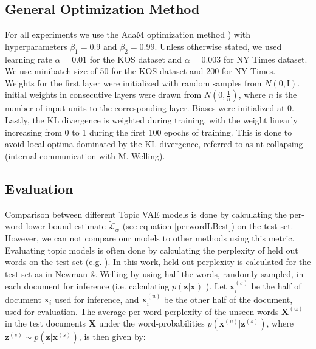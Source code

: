 \documentclass{report}
\begin{document}
	\subsection{General Optimization Method}\label{optim_section}
	For all experiments we use the AdaM optimization method \cite{kingma2014adam}) with hyperparameters $\beta_1 = 0.9$ and $\beta_2 = 0.99$. Unless otherwise stated, we used learning rate $\alpha = 0.01$ for the KOS dataset and $\alpha = 0.003$ for NY Times dataset.  We use minibatch size of 50 for the KOS dataset and 200 for NY Times.  \\
	Weights for the first layer were initialized with random samples from $N(0,\text{I})$. initial weights in consecutive layers were drawn from  $N(0,\frac{1}{n})$, where $n$ is the number of input units to the corresponding layer. Biases were initialized at 0.
	\\Lastly, the KL divergence is weighted during training, with the weight linearly increasing from 0 to 1 during the first 100 epochs of training. This is done to avoid local optima dominated by the KL divergence, referred to as nt collapsing (internal communication with M. Welling).
	
	\subsection{Evaluation}\label{eval_section}
	Comparison between different Topic VAE models is done by calculating the per-word lower bound estimate $\tilde{\mathcal{L}}_w$ (see equation \ref{perwordLBest}) on the test set. However, we can not compare our models to other methods using this metric. \\
	Evaluating topic models is often done by calculating the perplexity of held out words on the test set (e.g. \cite{blei2003latent, newman2007distributed, ranganath2015deep}). In this work, held-out perplexity is calculated for the test set as in Newman \& Welling \cite{newman2007distributed} by using half the words, randomly sampled, in each document for inference (i.e. calculating $p(\mathbf{z}|\mathbf{x})$ ). Let $\mathbf{x}_{i}^{(s)}$ be the half of document $\mathbf{x}_i$ used for inference, and $\mathbf{x}_{i}^{(u)}$ be the other half of the document, used for evaluation. The average per-word perplexity of the unseen words $\mathbf{X^{(u)}}$ in the test documents $\mathbf{X}$ under the word-probabilities $p(\mathbf{x}^{(u)}|\mathbf{z}^{(s)})$, where $\mathbf{z}^{(s)} \sim p(\mathbf{z}|\mathbf{x}^{(s)})$, is then given by:
	
\end{document}
